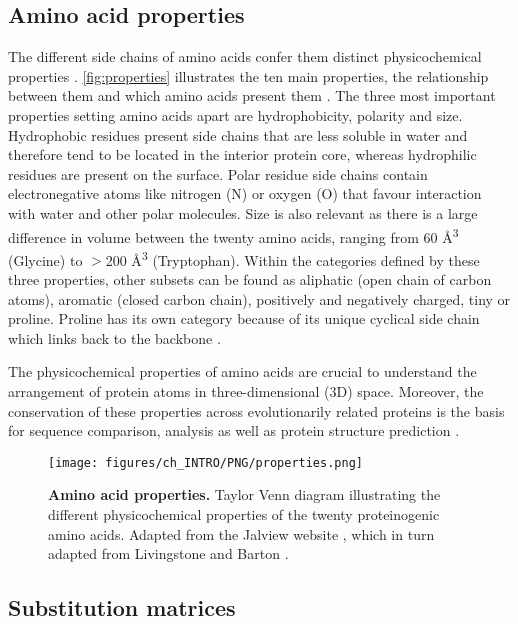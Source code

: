 \subsection{Amino acid properties}

The different side chains of amino acids confer them distinct physicochemical properties \cite{SNEATH_1966_PROPERTIES}. \autoref{fig:properties} illustrates the ten main properties, the relationship between them and which amino acids present them \cite{TAYLOR_1986_PROPERTIES}. The three most important properties setting amino acids apart are hydrophobicity, polarity and size. Hydrophobic residues present side chains that are less soluble in water and therefore tend to be located in the interior protein core, whereas hydrophilic residues are present on the surface. Polar residue side chains contain electronegative atoms like nitrogen (N) or oxygen (O) that favour interaction with water and other polar molecules. Size is also relevant as there is a large difference in volume between the twenty amino acids, ranging from 60 \AA{}\textsuperscript{3} (Glycine) to $>$200 \AA{}\textsuperscript{3} (Tryptophan). Within the categories defined by these three properties, other subsets can be found as aliphatic (open chain of carbon atoms), aromatic (closed carbon chain), positively and negatively charged, tiny or proline. Proline has its own category because of its unique cyclical side chain which links back to the backbone \cite{ZVELEBIL_1987_PREDICTION}.

The physicochemical properties of amino acids are crucial to understand the arrangement of protein atoms in three-dimensional (3D) space. Moreover, the conservation of these properties across evolutionarily related proteins is the basis for sequence comparison, analysis as well as protein structure prediction \cite{CHOTHIA_1986_CONSERVATION}.

\begin{figure}[htb!]
    \centering
    \texttt{[image: figures/ch\_INTRO/PNG/properties.png]}
    \caption[Amino acid properties]{\textbf{Amino acid properties.} Taylor Venn diagram illustrating the different physicochemical properties of the twenty proteinogenic amino acids. Adapted from the Jalview website \cite{JALVIEW}, which in turn adapted from Livingstone and Barton \cite{LIVINGSTONE_1993_MSA}.}
    \label{fig:properties}
\end{figure}

\subsection{Substitution matrices}

